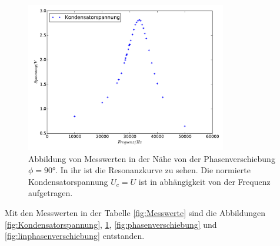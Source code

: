 \begin{figure}
  \centering
  \includegraphics[width=0.78\textwidth]{Resonanzkurve.pdf}
  \caption{Abbildung von Messwerten in der Nähe von der Phasenverschiebung $\phi=90°$.
  In ihr ist die Resonanzkurve zu sehen. Die normierte Kondensatorspannung $U_c=U$
  ist in abhängigkeit von der Frequenz aufgetragen.}
  \label{fig:Resonanzkurve}
\end{figure}
Mit den Messwerten in der Tabelle \ref{fig:Messwerte} sind die  Abbildungen
\ref{fig:Kondensatorspannung}, \ref{fig:Resonanzkurve},
\ref{fig:phasenverschiebung} und \ref{fig:linphasenverschiebung}
entstanden.
